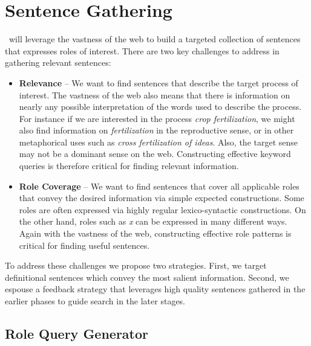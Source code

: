 \section{Sentence Gathering}

\sys\ will leverage the vastness of the web to build a targeted collection of sentences that expresses roles of interest.
There are two key challenges to address in gathering relevant sentences:
\begin{itemize}
\item {\bf Relevance} -- We want to find sentences that describe the target process of interest. 
The vastness of the web also means that there is information on nearly any possible interpretation of the words used to describe the process. 
For instance if we are interested in the process {\em crop fertilization}, we might also find information on {\em fertilization} in the reproductive sense, 
or in other metaphorical uses such as {\em cross fertilization of ideas}. 
Also, the target sense may not be a dominant sense on the web. 
Constructing effective keyword queries is therefore critical for finding relevant information.
\item {\bf Role Coverage} -- We want to find sentences that cover all applicable roles that convey the desired information via simple expected constructions.
Some roles are often expressed via highly regular lexico-syntactic constructions. 
On the other hand, roles such as {\em x} can be expressed in many different ways. 
Again with the vastness of the web, constructing effective role patterns is critical for finding useful sentences. 
\end{itemize}

To address these challenges we propose two strategies. First, we target definitional sentences which convey the most salient information. Second, we espouse a feedback strategy that leverages high quality sentences gathered in the earlier phases to guide search in the later stages.

\subsection{Role Query Generator}

